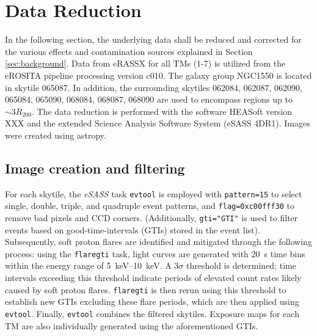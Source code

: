 
\chapter{Data Reduction}
\label{sec:data_reduction}
In the following section, the underlying data shall be reduced and corrected for the various effects and contamination sources explained in Section \ref{sec:background}. Data from eRASSX for all TMs (1-7) is utilized from the eROSITA pipeline processing version c010. The galaxy group NGC1550 is located in skytile 065087. In addition, the surrounding skytiles 062084, 062087, 062090, 065084, 065090, 068084, 068087, 068090 are used to encompass regions up to \(\sim 3R_{200}\). The data reduction is performed with the software HEASoft version XXX and the extended Science Analysis Software System (eSASS 4DR1). Images were created using astropy.
\section{Image creation and filtering}
For each skytile, the \textit{eSASS} task \texttt{evtool} is employed with \texttt{pattern=15} to select single, double, triple, and quadruple event patterns, and \texttt{flag=0xc00fff30} to remove bad pixels and CCD corners. (Additionally, \texttt{gti="GTI"} is used to filter events based on good-time-intervals (GTIs) stored in the event list). Subsequently, soft proton flares are identified and mitigated through the following process: using the \texttt{flaregti} task, light curves are generated with \SI{20}{\second} time bins within the energy range of \SIrange{5}{10}{\kilo\electronvolt}. A \(3\sigma\) threshold is determined; time intervals exceeding this threshold indicate periods of elevated count rates likely caused by soft proton flares. \texttt{flaregti} is then rerun using this threshold to establish new GTIs excluding these flare periods, which are then applied using \texttt{evtool}. Finally, \texttt{evtool} combines the filtered skytiles. Exposure maps for each TM are also individually generated using the aforementioned GTIs.













